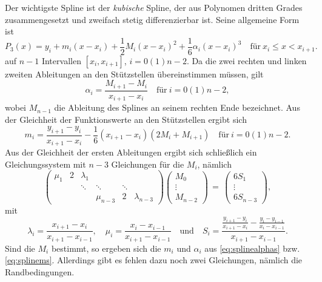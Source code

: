 Der wichtigste Spline ist der \emph{kubische}
Spline, der aus Polynomen dritten Grades
zusammengesetzt und zweifach stetig differenzierbar ist. Seine
allgemeine Form ist
\begin{equation}
  P_3(x) = y_i + m_i(x-x_i) + \frac{1}{2}M_i(x-x_i)^2 + \frac{1}{6}\alpha_i(x-x_i)^3
  \quad\text{für}~ x_i \le x < x_{i+1}.
\end{equation}
auf $n-1$ Intervallen $[x_i, x_{i+1}]$, $i=0(1)n-2$.  Da die zwei
rechten und linken zweiten Ableitungen an den Stützstellen
übereinstimmen müssen, gilt
\begin{equation}
  \label{eq:splinealphas}
  \alpha_i = \frac{M_{i+1} - M_i}{x_{i+1} - x_i} \quad\text{für}~ i = 0(1)n-2,
\end{equation}
wobei $M_{n-1}$ die Ableitung des Splines an seinem rechten Ende
bezeichnet.  Aus der Gleichheit der Funktionswerte an den Stützstellen
ergibt sich
\begin{equation}
  \label{eq:splinems}
  m_i = \frac{y_{i+1} - y_i}{x_{i+1}-x_i} -
  \frac{1}{6}(x_{i+1}-x_i)(2M_i + M_{i+1}) \quad\text{für}~ i = 0(1)n-2.
\end{equation}
Aus der Gleichheit der ersten Ableitungen ergibt sich schließlich ein
Gleichungssystem mit $n-3$ Gleichungen für die $M_i$, nämlich
\begin{equation}
  \begin{pmatrix}
    \mu_1  & 2         & \lambda_1 \\
           &           & \ddots    & \ddots    & \ddots \\
           &           &           & \mu_{n-3}  & 2         & \lambda_{n-3}
  \end{pmatrix}
  \begin{pmatrix}
    M_0\\
    \vdots\\
    M_{n-2}
  \end{pmatrix} \,=\,
  \begin{pmatrix}
    6S_1\\
    \vdots\\
    6S_{n-3}
  \end{pmatrix},
\end{equation}
mit
\begin{equation}
  \lambda_i = \frac{x_{i+1}-x_i}{x_{i+1} - x_{i-1}},\quad
  \mu_i = \frac{x_i - x_{i-1}}{x_{i+1} - x_{i-1}}\quad\text{und}\quad
  S_i = \frac{\frac{y_{i+1}-y_i}{x_{i+1} -
      x_i} - \frac{y_i-y_{i-1}}{x_i - x_{i-1}}}{x_{i+1}-x_{i-1}}.
\end{equation}
Sind die $M_i$ bestimmt, so ergeben sich die $m_i$ und $\alpha_i$ aus
\eqref{eq:splinealphas} bzw.  \eqref{eq:splinems}. Allerdings gibt es
fehlen dazu noch zwei Gleichungen, nämlich die Randbedingungen.

